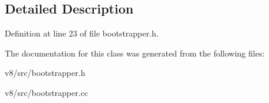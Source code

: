 \subsection{Detailed Description}


Definition at line 23 of file bootstrapper.\+h.



The documentation for this class was generated from the following files\+:\begin{DoxyCompactItemize}
\item 
v8/src/bootstrapper.\+h\item 
v8/src/bootstrapper.\+cc\end{DoxyCompactItemize}
